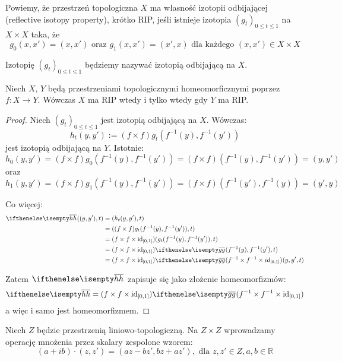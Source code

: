 \begin{df}
  Powiemy, że przestrzeń topologiczna $X$ ma własność izotopii odbijającej (reflective isotopy property), krótko RIP, jeśli istnieje izotopia $(g_t)_{0 \leq t \leq 1}$ na $X \times X$ taka, że
  \[g_0(x, x') = (x, x') \mbox{ oraz } g_1(x, x') = (x', x) \mbox{ dla każdego } (x, x') \in X \times X\]
  
  Izotopię $(g_t)_{0 \leq t \leq 1}$ będziemy nazywać izotopią odbijającą na $X$.
\end{df}

\begin{ex}
  Niech $X$, $Y$ będą przestrzeniami topologicznymi homeomorficznymi poprzez $f: X \rightarrow Y$. Wówczas $X$ ma RIP wtedy i tylko wtedy gdy $Y$ ma RIP.
  \begin{proof}
    Niech $(g_t)_{0 \leq t \leq 1}$ jest izotopią odbijającą na $X$. Wówczas:
    \[h_t(y, y') := (f \times f) g_t(f^{-1}(y), f^{-1}(y'))\]
    jest izotopią odbijającą na $Y$. Istotnie:
    \[h_0(y,y') = (f \times f) g_0(f^{-1}(y), f^{-1}(y')) = (f \times f)(f^{-1}(y), f^{-1}(y')) = (y, y')\]
    oraz
    \[h_1(y,y') = (f \times f) g_1(f^{-1}(y), f^{-1}(y')) = (f \times f)(f^{-1}(y'), f^{-1}(y)) = (y', y)\]
    
    Co więcej:
    \begin{align*}
      \cl{h}((y, y'), t) & = (h_t(y,y'), t) \\
      & = ((f \times f)g_t(f^{-1}(y), f^{-1}(y')), t) \\
      & = (f \times f \times \id_{[0,1]}) (g_t(f^{-1}(y), f^{-1}(y')), t) \\
      & = (f \times f \times \id_{[0,1]}) \cl{g} (f^{-1}(y), f^{-1}(y'), t) \\
      & = (f \times f \times \id_{[0,1]}) \cl{g} (f^{-1} \times f^{-1} \times id_{[0,1]})(y, y', t) 
    \end{align*}
    
    Zatem $\cl{h}$ zapisuje się jako złożenie homeomorfizmów:
    \[\cl{h} = (f \times f \times \id_{[0,1]}) \cl{g} (f^{-1} \times f^{-1} \times \id_{[0,1]})\]
    a więc i samo jest homeomorfizmem.
  \end{proof}
\end{ex}

\begin{df}
  Niech $Z$ będzie przestrzenią liniowo-topologiczną. Na $Z \times Z$ wprowadzamy operację mnożenia przez skalary zespolone wzorem:
  \[
    (a+ib) \cdot (z, z') = (az - bz', bz + az'),\mbox{ dla }z, z' \in Z, a,b \in \mathbb{R}
  \]
\end{df}

